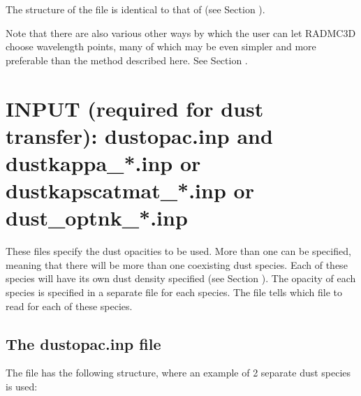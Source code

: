 \documentclass[letterpaper,10pt,english]{sphinxmanual}
\begin{document}
The structure of the  file is
identical to that of  (see Section
{\hyperref[\detokenize{inputoutputfiles:sec-wavelengths}]{}}).

Note that there are also various other ways by which the user can let
RADMC\sphinxhyphen{}3D choose wavelength points, many of which may be even simpler
and more preferable than the method described here. See Section
{\hyperref[\detokenize{imagesspectra:sec-set-camera-frequencies}]{}}.


\section{INPUT (required for dust transfer): dustopac.inp and dustkappa\_*.inp or dustkapscatmat\_*.inp or dust\_optnk\_*.inp}
\label{\detokenize{inputoutputfiles:input-required-for-dust-transfer-dustopac-inp-and-dustkappa-inp-or-dustkapscatmat-inp-or-dust-optnk-inp}}\label{\detokenize{inputoutputfiles:sec-opacities}}
These files specify the dust opacities to be used. More than one can be
specified, meaning that there will be more than one co\sphinxhyphen{}existing dust
species. Each of these species will have its own dust density specified
(see Section {\hyperref[\detokenize{inputoutputfiles:sec-dustdens}]{}}). The opacity of each species is specified
in a separate file for each species. The  file tells which
file to read for each of these species.


\subsection{The dustopac.inp file}
\label{\detokenize{inputoutputfiles:the-dustopac-inp-file}}\label{\detokenize{inputoutputfiles:sec-dustopac-inp-file}}
The file  has the following structure, where an example
of 2 separate dust species is used:
\end{document}
